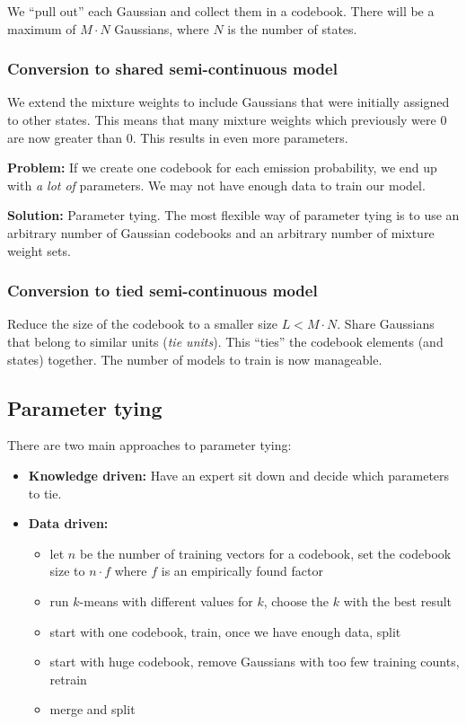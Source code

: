 \documentclass[11pt]{article}
\begin{document}
We ``pull out'' each Gaussian and collect them in a codebook. There will be a maximum of $M \cdot N$ Gaussians, where $N$ is the number of states.

\subsubsection{Conversion to shared semi-continuous model}

We extend the mixture weights to include Gaussians that were initially assigned to other states. This means that many mixture weights which previously were $0$ are now greater than $0$. This results in even more parameters.

\vspace{15pt}

\textbf{Problem:} If we create one codebook for each emission probability, we end up with \textit{a lot of} parameters. We may not have enough data to train our model.

\vspace{5pt}

\textbf{Solution:} Parameter tying. The most flexible way of parameter tying is to use an arbitrary number of Gaussian codebooks and an arbitrary number of mixture weight sets.

\subsubsection{Conversion to tied semi-continuous model}

Reduce the size of the codebook to a smaller size $L < M \cdot N$. Share Gaussians that belong to similar units (\textit{tie units}). This ``ties'' the codebook elements (and states) together. The number of models to train is now manageable.

\subsection{Parameter tying}

There are two main approaches to parameter tying:
\begin{itemize}
    \item \textbf{Knowledge driven:} Have an expert sit down and decide which parameters to tie.
    \item \textbf{Data driven:}
        \begin{itemize}
            \item let $n$ be the number of training vectors for a codebook, set the codebook size to $n \cdot f$ where $f$ is an empirically found factor
            \item run $k$-means with different values for $k$, choose the $k$ with the best result
            \item start with one codebook, train, once we have enough data, split
            \item start with huge codebook, remove Gaussians with too few training counts, retrain
            \item merge and split
        \end{itemize}
\end{itemize}
\end{document}
